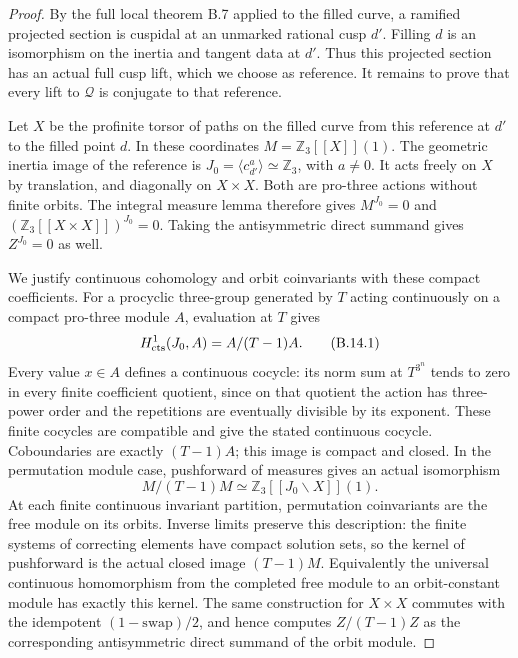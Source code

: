 \begin{proof}
By the full local theorem B.7 applied to the
filled curve, a ramified projected section is
cuspidal at an unmarked rational cusp $d'$.
Filling $d$ is an isomorphism on the inertia
and tangent data at $d'$. Thus this projected
section has an actual full cusp lift, which we
choose as reference. It remains to prove that
every lift to $\mathscr Q$ is conjugate to that
reference.

Let $X$ be the profinite torsor of paths on the
filled curve from this reference at $d'$ to the
filled point $d$. In these coordinates
$M=\mathbb Z_3[[X]](1)$.
The geometric inertia image of the reference
is $J_0=\langle c_{d'}^a\rangle\simeq\mathbb Z_3$,
with $a\ne0$. It acts freely on $X$ by translation,
and diagonally on $X\times X$.
Both are pro-three actions without finite orbits.
The integral measure lemma therefore gives
$M^{J_0}=0$ and
$(\mathbb Z_3[[X\times X]])^{J_0}=0$.
Taking the antisymmetric direct summand gives
$Z^{J_0}=0$ as well.

We justify continuous cohomology and orbit
coinvariants with these compact coefficients.
For a procyclic three-group generated by $T$
acting continuously on a compact pro-three
module $A$, evaluation at $T$ gives
\[
              H^1_{\rm cts}(J_0,A)=A/(T-1)A.               \tag{B.14.1}
\]
Every value $x\in A$ defines a continuous cocycle:
its norm sum at $T^{3^n}$ tends to zero in every
finite coefficient quotient, since on that
quotient the action has three-power order
and the repetitions are eventually divisible
by its exponent. These finite cocycles are
compatible and give the stated continuous
cocycle. Coboundaries are exactly $(T-1)A$;
this image is compact and closed.
In the permutation module case, pushforward
of measures gives an actual isomorphism
\[
 M/(T-1)M
               \simeq\mathbb Z_3[[J_0\backslash X]](1).
                                                               \tag{B.14.2}
\]
At each finite continuous invariant partition,
permutation coinvariants are the free module
on its orbits. Inverse limits preserve this
description: the finite systems of correcting
elements have compact solution sets, so the
kernel of pushforward is the actual closed
image $(T-1)M$. Equivalently the universal
continuous homomorphism from the completed
free module to an orbit-constant module has
exactly this kernel.
The same construction for $X\times X$ commutes
with the idempotent $(1-\mathrm{swap})/2$,
and hence computes $Z/(T-1)Z$ as the corresponding
antisymmetric direct summand of the orbit module.


\end{proof}
